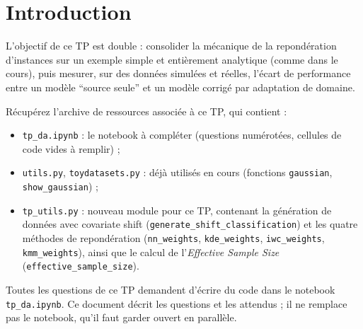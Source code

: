 \documentclass[11pt]{article}
\begin{document}
\pagestyle{fancy}

\section{Introduction}

L'objectif de ce TP est double : consolider la mécanique de la repondération d'instances sur un
exemple simple et entièrement analytique (comme dans le cours), puis mesurer, sur des données
simulées et réelles, l'écart de performance entre un modèle \enquote{source seule} et un modèle
corrigé par adaptation de domaine.

Récupérez l'archive de ressources associée à ce TP, qui contient :
\begin{itemize}
\item \texttt{tp\_da.ipynb} : le notebook à compléter (questions numérotées, cellules de code
vides à remplir) ;
\item \texttt{utils.py}, \texttt{toydatasets.py} : déjà utilisés en cours (fonctions
\texttt{gaussian}, \texttt{show\_gaussian}) ;
\item \texttt{tp\_utils.py} : nouveau module pour ce TP, contenant la génération de données avec
covariate shift (\texttt{generate\_shift\_classification}) et les quatre méthodes de repondération
(\texttt{nn\_weights}, \texttt{kde\_weights}, \texttt{iwc\_weights}, \texttt{kmm\_weights}), ainsi
que le calcul de l'\textit{Effective Sample Size} (\texttt{effective\_sample\_size}).
\end{itemize}

\begin{remark}
Toutes les questions de ce TP demandent d'écrire du code dans le notebook \texttt{tp\_da.ipynb}. Ce
document décrit les questions et les attendus ; il ne remplace pas le notebook, qu'il faut garder
ouvert en parallèle.
\end{remark}
\end{document}
